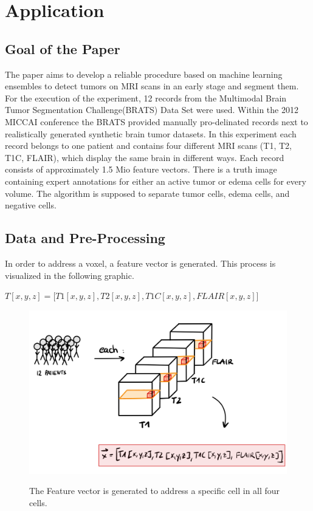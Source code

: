 \documentclass[
12pt,
headsepline,
bibliography=totoc,
twoside=semi,
fleqn
]{scrartcl}
\begin{document}
\section{Application\label{sec:sec3}}

 \subsection{Goal of the Paper\label{sec:sec3-1}}
 The paper aims to develop a reliable procedure based on machine learning ensembles to detect tumors on MRI scans in an early stage and segment them. For the execution of the experiment, 12 records from the Multimodal Brain Tumor Segmentation Challenge(BRATS) Data Set were used. Within the 2012 MICCAI conference the BRATS provided manually pro-delinated records next to realistically generated synthetic brain tumor datasets. In this experiment each record belongs to one patient and contains four different MRI scans (T1, T2, T1C, FLAIR), which display the same brain in different ways. Each record consists of approximately 1.5 Mio feature vectors. There is a truth image containing expert annotations for either an active tumor or edema cells for every volume. The algorithm is supposed to separate tumor cells, edema cells, and negative cells.

 \subsection{Data and Pre-Processing\label{sec:sec3-2}}
 In order to address a voxel, a feature vector is generated. This process is visualized in the following graphic.\\
 
 \begin{center} $T[x,y,z] = \biggl[T1[x,y,z], T2[x,y,z], T1C[x,y,z], FLAIR[x,y,z]\biggr]$\end{center}

 \begin{figure}[H]
 \centering \includegraphics[scale=0.5]{BDT14.png}\label{fig:fig14}
 \caption{The Feature vector is generated to address a specific cell in all four cells.}
 \end{figure}
\end{document}
